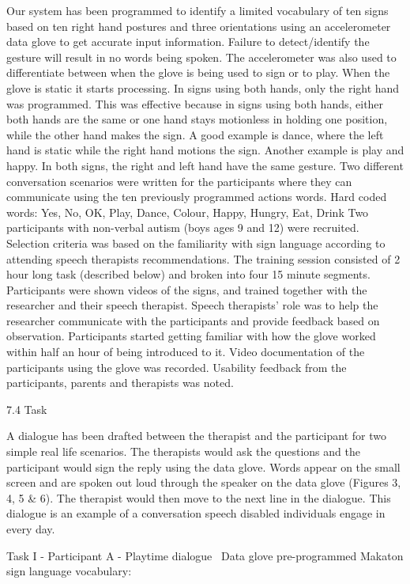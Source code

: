 Our system has been programmed to identify a limited vocabulary of ten signs based on ten right hand postures and three orientations using an accelerometer data glove to get accurate input information. Failure to detect/identify the gesture will result in no words being spoken. The accelerometer was also used to differentiate between when the glove is being used to sign or to play. When the glove is static it starts processing. In signs using both hands, only the right hand was programmed. This was effective because in signs using both hands, either both hands are the same or one hand stays motionless in holding one position, while the other hand makes the sign. A good example is dance, where the left hand is static while the right hand motions the sign. Another example is play and happy. In both signs, the right and left hand have the same gesture. Two different conversation scenarios were written for the participants where they can communicate using the ten previously programmed actions words. Hard coded words: Yes, No, OK, Play, Dance, Colour, Happy, Hungry, Eat, Drink 
Two participants with non-verbal autism (boys ages 9 and 12) were recruited. Selection criteria was based on the familiarity with sign language according to attending speech therapists recommendations. The training session consisted of 2 hour long task (described below) and broken into four 15 minute segments. Participants were shown videos of the signs, and trained together with the researcher and their speech therapist. Speech therapists’ role was to help the researcher communicate with the participants and provide feedback based on observation. Participants started getting familiar with how the glove worked within half an hour of being introduced to it. Video documentation of the participants using the glove was recorded. Usability feedback from the participants, parents and therapists was noted. 

7.4 Task

A dialogue has been drafted between the therapist and the participant for two simple real life scenarios. The therapists would ask the questions and the participant would sign the reply using the data glove. Words appear on the small screen and are spoken out loud through the speaker on the data glove (Figures 3, 4, 5 & 6). The therapist would then move to the next line in the dialogue. This dialogue is an example of a conversation speech disabled individuals engage in every day. 

Task I - Participant A - Playtime dialogue 
Data glove pre-programmed Makaton sign language vocabulary: 

